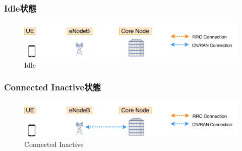 \documentclass[a4j]{ujarticle}
\begin{document}
  \subsubsection{Idle状態}
    \begin{figure}[htbp]
      \centering
      \includegraphics[width=0.7\hsize]{Idle.pdf}
      \caption{Idle}
      \label{Idle}
    \end{figure}

  \subsubsection{Connected Inactive状態}
    \begin{figure}[htbp]
      \centering
      \includegraphics[width=0.7\hsize]{Connected_Inactive.pdf}
      \caption{Connected Inactive}
      \label{Connected Inactive}
    \end{figure}
\end{document}
